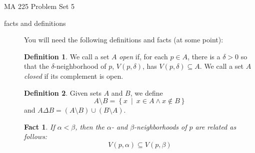 \documentclass[11pt]{letter}
\newtheorem*{fact}{Fact}
\theoremstyle{definition}
\newtheorem{definition}{Definition}
\begin{document}
\pagestyle{empty}

{\Large MA 225 Problem Set 5}\\





\begin{description}
	\item[facts and definitions] You will need the following definitions and facts (at some point):
	
	\begin{definition}
	We call a set $A$ {\em open} if, for each $p\in A$, there is a $\delta>0$ so that the $\delta$-neighborhood of $p$, $V(p,\delta)$, has $V(p,\delta)\subseteq A$. We call a set $A$ {\em closed} if its complement is open.
\end{definition}

\begin{definition}
	Given sets $A$ and $B$, we define 
		$$A\setminus B = \left\{x\ \middle\vert\ x\in A \wedge x\notin B\right\}$$
	and $A\Delta B=(A\setminus B) \cup (B\setminus A)$.
\end{definition}

\begin{fact}
	If $\alpha<\beta$, then the $\alpha$- and $\beta$-neighborhoods of $p$ are related as follows: $$V(p,\alpha)\subseteq V(p,\beta)$$
\end{fact}

\bigskip


\end{description}
\end{document}
